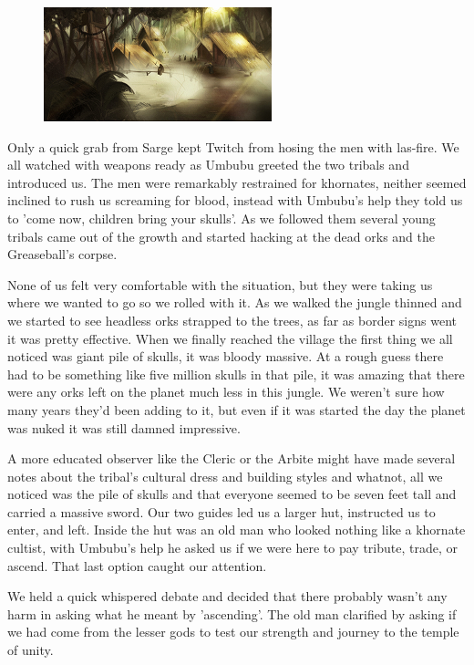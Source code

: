 \begin{figure}
	\begin{center}
		\includegraphics[width=\figwidth]{pics/6/32.png}
	\end{center}
\end{figure}
Only a quick grab from Sarge kept Twitch from hosing the men with las-fire. 
We all watched with weapons ready as Umbubu greeted the two tribals and introduced us. 
The men were remarkably restrained for khornates, neither seemed inclined to rush us screaming for blood, instead with Umbubu's help they told us to 'come now, children bring your skulls'. 
As we followed them several young tribals came out of the growth and started hacking at the dead orks and the Greaseball's corpse.

None of us felt very comfortable with the situation, but they were taking us where we wanted to go so we rolled with it. 
As we walked the jungle thinned and we started to see headless orks strapped to the trees, as far as border signs went it was pretty effective. 
When we finally reached the village the first thing we all noticed was giant pile of skulls, it was bloody massive. 
At a rough guess there had to be something like five million skulls in that pile, it was amazing that there were any orks left on the planet much less in this jungle. 
We weren't sure how many years they'd been adding to it, but even if it was started the day the planet was nuked it was still damned impressive.

A more educated observer like the Cleric or the Arbite might have made several notes about the tribal's cultural dress and building styles and whatnot, all we noticed was the pile of skulls and that everyone seemed to be seven feet tall and carried a massive sword. 
Our two guides led us a larger hut, instructed us to enter, and left. 
Inside the hut was an old man who looked nothing like a khornate cultist, with Umbubu's help he asked us if we were here to pay tribute, trade, or ascend. 
That last option caught our attention.

We held a quick whispered debate and decided that there probably wasn't any harm in asking what he meant by 'ascending'. 
The old man clarified by asking if we had come from the lesser gods to test our strength and journey to the temple of unity.


